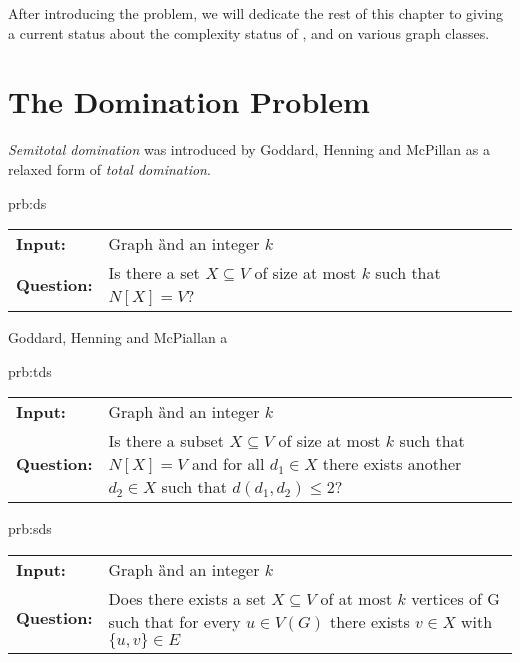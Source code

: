 After introducing the problem, we will dedicate the rest of this chapter to giving a current status about the complexity status of \dom, \sdom and \tdom on various graph classes. 



\section{The Domination Problem}

\textit{Semitotal domination} was introduced by Goddard, Henning and McPillan \cite{Goddard2014} as a relaxed form of \textit{total domination}. 

\begin{prb}{prb:ds}
    \begin{tabularx}{0.9\textwidth}{>{\hsize=0.30\hsize}X>{\hsize=0.8\hsize}X}
        \textbf{Input:} & Graph \G and an integer $k$\\
        \textbf{Question:} & Is there a set $X \subseteq V$ of size at most $k$ such that $N[X] = V$? \\
    \end{tabularx}
\end{prb}


Goddard, Henning and McPiallan a

\begin{prb}{prb:tds}
    
    \begin{tabularx}{0.8\textwidth}{>{\hsize=0.35\hsize}X>{\hsize=0.8\hsize}X}
        \textbf{Input:} & Graph \G and an integer $k$\\
        \textbf{Question:} & Is there a subset $X \subseteq V$ of size at most $k$ such that $N[X] = V$ and for all $d_1 \in X$ there exists another $d_2 \in X$ such that $d(d_1, d_2) \leq 2$?\\
    \end{tabularx}
        
\end{prb}

\begin{prb}{prb:sds}
    \begin{tabularx}{0.8\textwidth}{>{\hsize=0.35\hsize}X>{\hsize=0.8\hsize}X}
        \textbf{Input:} & Graph \G and an integer $k$\\
        \textbf{Question:} & Does there exists a set $X \subseteq V$ of at most $k$ vertices of G such that for every $u \in V(G)$ there exists $v \in X$ with $\{u,v\} \in E$ \\
    \end{tabularx}
        
\end{prb}

